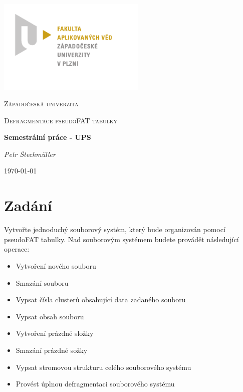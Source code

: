 \documentclass{report}
\begin{document}
\begin{titlepage}
		\includegraphics[width=267px]{img/fav_logo.pdf}\par\vspace{1cm}
		\centering
		{\scshape\LARGE Západočeská univerzita \par}
		\vspace{0.5cm}
		{\scshape\Large Defragmentace pseudoFAT tabulky\par}
		\vspace{2cm}
		{\Large\bfseries Semestrální práce - UPS \par}
		\vspace{0.5cm}
		{\Large\itshape Petr Štechmüller\par}
		\vfill
		{\large \today\par}
\end{titlepage}

\tableofcontents

\chapter*{Zadání}
Vytvořte jednoduchý souborový systém, který bude organizován pomocí pseudoFAT tabulky. Nad souborovým systémem budete provádět následující operace:
\begin{itemize}
\item Vytvoření nového souboru
\item Smazání souboru
\item Vypsat čísla clusterů obsahující data zadaného souboru
\item Vypsat obsah souboru
\item Vytvoření prázdné složky
\item Smazání prázdné sožky
\item Vypsat stromovou strukturu celého souborového systému
\item Provést úplnou defragmentaci souborového systému
\end{itemize}
\end{document}
